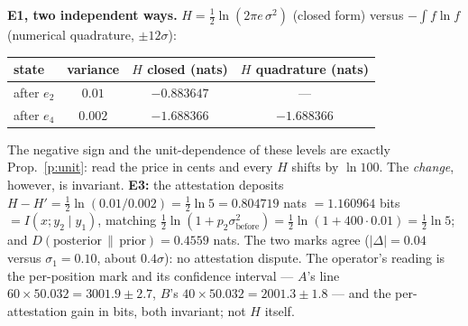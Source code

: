 \documentclass[11pt]{article}
\theoremstyle{definition}\newtheorem{definition}{Definition}
\theoremstyle{plain}\newtheorem{proposition}{Proposition}
\theoremstyle{remark}\newtheorem{remark}{Remark}
\newcommand{\ev}{e}                  %
\newcommand{\st}{x}                  %
\newcommand{\obs}{y}                 %
\newcommand{\acc}{p}                 %
\newcommand{\Ent}{H}                 %
\newcommand{\KL}{D}                  %
\begin{document}
\smallskip\noindent\textbf{E1, two independent ways.} $\Ent=\tfrac12\ln(2\pi e\,\sigma^2)$
(closed form) versus $-\int f\ln f$ (numerical quadrature, $\pm12\sigma$):

\vspace{-0.5em}\begin{center}\small
\begin{tabular}{lccc}
\toprule
state & variance & $\Ent$ closed (nats) & $\Ent$ quadrature (nats) \\
\midrule
after $\ev_2$ & $0.01$  & $-0.883647$ & --- \\
after $\ev_4$ & $0.002$ & $\mathbf{-1.688366}$ & $\mathbf{-1.688366}$ \\
\bottomrule
\end{tabular}
\end{center}

\noindent The negative sign and the unit-dependence of these levels are exactly
Prop.~\ref{p:unit}: read the price in cents and every $\Ent$ shifts by $\ln100$. The
\emph{change}, however, is invariant. \textbf{E3:} the attestation deposits
$\Ent-\Ent'=\tfrac12\ln(0.01/0.002)=\tfrac12\ln5=\mathbf{0.804719}$ nats
$=1.160964$ bits $=I(\st;\obs_2\mid\obs_1)$, matching
$\tfrac12\ln(1+\acc_2\sigma_{\text{before}}^2)=\tfrac12\ln(1+400\cdot0.01)=\tfrac12\ln5$; and
$\KL(\text{posterior}\,\|\,\text{prior})=0.4559$ nats. The two marks agree
($|\Delta|=0.04$ versus $\sigma_1=0.10$, about $0.4\sigma$): no attestation dispute. The
operator's reading is the per-position mark and its confidence interval --- $A$'s line
$60\times50.032=3001.9\pm2.7$, $B$'s $40\times50.032=2001.3\pm1.8$ --- and the per-attestation
gain in bits, both invariant; not $\Ent$ itself.
\end{document}
